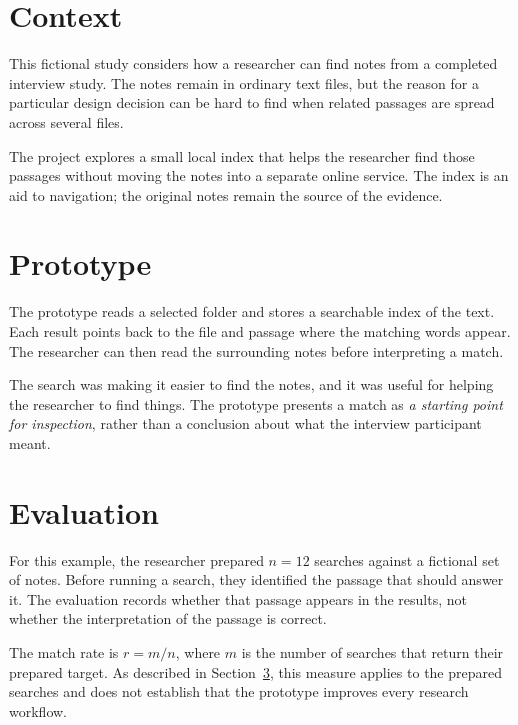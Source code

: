 \documentclass{article}
\begin{document}
\section{Context}

This fictional study considers how a researcher can find notes from a completed
interview study. The notes remain in ordinary text files, but the reason for a
particular design decision can be hard to find when related passages are spread
across several files.

The project explores a small local index that helps the researcher find those
passages without moving the notes into a separate online service. The index is
an aid to navigation; the original notes remain the source of the evidence.

\section{Prototype}

The prototype reads a selected folder and stores a searchable index of the text.
Each result points back to the file and passage where the matching words appear.
The researcher can then read the surrounding notes before interpreting a match.

The search was making it easier to find the notes, and it was useful for
helping the researcher to find things. The prototype presents a match as
\emph{a starting point for inspection}, rather than a conclusion about what
the interview participant meant.

\section{Evaluation}\label{sec:evaluation}
For this example, the researcher prepared \(n = 12\) searches against a
fictional set of notes. Before running a search, they identified the passage
that should answer it. The evaluation records whether that passage appears in
the results, not whether the interpretation of the passage is correct.

The match rate is \(r = m/n\), where \(m\) is the number of searches that
return their prepared target. As described in Section~\ref{sec:evaluation},
this measure applies to the prepared searches and does not establish that the
prototype improves every research workflow.
\end{document}
